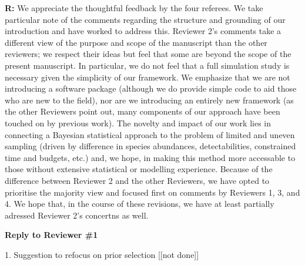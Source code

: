 \documentclass[12pt]{letter}
\begin{document}
	\textbf{R:} We appreciate the thoughtful feedback by the four referees. We take particular note of the comments regarding the structure and grounding of our introduction and have worked to address this. Reviewer 2's comments take a different view of the purpose and scope of the manuscript than the other reviewers; we respect their ideas but feel that some are beyond the scope of the present manuscript. In particular, we do not feel that a full simulation study is necessary given the simplicity of our framework. We emphasize that we are not introducing a software package (although we do provide simple code to aid those who are new to the field), nor are we introducing an entirely new framework (as the other Reviewers point out, many components of our approach have been touched on by previous work). The novelty and impact of our work lies in connecting a Bayesian statistical approach to the problem of limited and uneven sampling (driven by difference in species abundances, detectabilities, constrained time and budgets, etc.) and, we hope, in making this method more accessable to those without extensive statistical or modelling experience. Because of the difference between Reviewer 2 and the other Reviewers, we have opted to prioritise the majority view and focused first on comments by Reviewers 1, 3, and 4. We hope that, in the course of these revisions, we have at least partially adressed Reviewer 2's concertns as well. 

\newpage


{\Large \bf Reply to Reviewer \#1}

	1. Suggestion to refocus on prior selection [[not done]]
\end{document}
